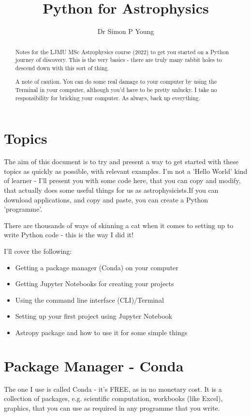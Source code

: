 \documentclass{article}
\title{Python for Astrophysics}
\author{Dr Simon P Young}
\begin{document}
\maketitle

\begin{abstract}
Notes for the LJMU MSc Astrophysics course (2022) to get you started on a Python journey of discovery. This is the very basics - there are truly many rabbit holes to descend down with this sort of thing. 

A note of caution. You can do some real damage to your computer by using the Terminal in your computer, although you'd have to be pretty unlucky. I take no responsibility for bricking your computer. As always, back up everything. 
\end{abstract}

\tableofcontents

\newpage

\section{Topics}
The aim of this document is to try and present a way to get started with these topics as quickly as possible, with relevant examples. I'm not a 'Hello World' kind of learner - I'll present you with some code here, that you can copy and modify, that actually does some useful things for us as astrophysicists.If you can download applications, and copy and paste, you can create a Python 'programme'. 

There are thousands of ways of skinning a cat when it comes to setting up to write Python code - this is the way I did it!

I'll cover the following:
\begin{itemize}
\item Getting a package manager (Conda) on your computer
\item Getting Jupyter Notebooks for creating your projects
\item Using the command line interface (CLI)/Terminal
\item Setting up your first project using Jupyter Notebook
\item Astropy package and how to use it for some simple things

\end{itemize}

\section{Package Manager - Conda}
The one I use is called Conda - it's FREE, as in no monetary cost. It is a collection of packages, e.g. scientific computation, workbooks (like Excel), graphics, that you can use as required in any programme that you write. 
\end{document}
